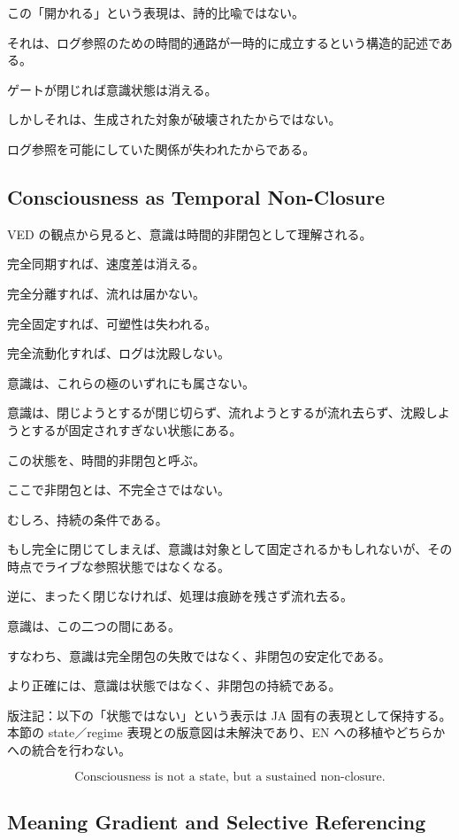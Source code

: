 この「開かれる」という表現は、詩的比喩ではない。

それは、ログ参照のための時間的通路が一時的に成立するという構造的記述である。

ゲートが閉じれば意識状態は消える。

しかしそれは、生成された対象が破壊されたからではない。

ログ参照を可能にしていた関係が失われたからである。

\subsection{Consciousness as Temporal Non-Closure}

VED の観点から見ると、意識は時間的非閉包として理解される。

完全同期すれば、速度差は消える。

完全分離すれば、流れは届かない。

完全固定すれば、可塑性は失われる。

完全流動化すれば、ログは沈殿しない。

意識は、これらの極のいずれにも属さない。

意識は、閉じようとするが閉じ切らず、流れようとするが流れ去らず、沈殿しようとするが固定されすぎない状態にある。

この状態を、時間的非閉包と呼ぶ。

ここで非閉包とは、不完全さではない。

むしろ、持続の条件である。

もし完全に閉じてしまえば、意識は対象として固定されるかもしれないが、その時点でライブな参照状態ではなくなる。

逆に、まったく閉じなければ、処理は痕跡を残さず流れ去る。

意識は、この二つの間にある。

すなわち、意識は完全閉包の失敗ではなく、非閉包の安定化である。

より正確には、意識は状態ではなく、非閉包の持続である。

版注記：以下の「状態ではない」という表示は JA 固有の表現として保持する。本節の state／regime 表現との版意図は未解決であり、EN への移植やどちらかへの統合を行わない。

\begin{equation}
\text{Consciousness is not a state, but a sustained non-closure.}
\end{equation}

\subsection{Meaning Gradient and Selective Referencing}

